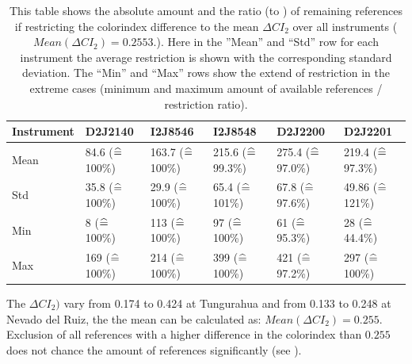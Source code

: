 \begin{table}[h]
	\centering
	\begin{tabular}{|p{1.8cm}|p{2.15cm}|p{2.15cm}|p{2.15cm}|p{2.15cm}|p{2.15cm}|}
		Instrument	&D2J2140&I2J8546& I2J8548&D2J2200&D2J2201\\
		\toprule
		Mean&
		84.6 ($\mathrel{\widehat{=}}\,$100\%) &	163.7 ($\mathrel{\widehat{=}}\,$100\%)&	215.6 ($\mathrel{\widehat{=}}\,$99.3\%)&
		275.4 ($\mathrel{\widehat{=}}\,$97.0\%) &219.4 ($\mathrel{\widehat{=}}\,$97.3\%) \\
		\midrule
		Std&
		35.8 ($\mathrel{\widehat{=}}\,$100\%) &	29.9 ($\mathrel{\widehat{=}}\,$100\%) &
		65.4 ($\mathrel{\widehat{=}}\,$101\%)&
		67.8 ($\mathrel{\widehat{=}}\,$97.6\%) &
		49.86 ($\mathrel{\widehat{=}}\,$121\%) \\
		\midrule
		Min&
		8 ($\mathrel{\widehat{=}}\,$100\%) &
		113 ($\mathrel{\widehat{=}}\,$100\%) 
		&97 ($\mathrel{\widehat{=}}\,$100\%) 
		&61 ($\mathrel{\widehat{=}}\,$95.3\%) 
		&28	 ($\mathrel{\widehat{=}}\,$44.4\%) \\
		\midrule
		Max
		&169 ($\mathrel{\widehat{=}}\,$100\%) 
		&214 ($\mathrel{\widehat{=}}\,$100\%) 
		&399 ($\mathrel{\widehat{=}}\,$100\%) 
		&421 ($\mathrel{\widehat{=}}\,$97.2\%) 
		&297 ($\mathrel{\widehat{=}}\,$100\%)  \\
		\bottomrule
	\end{tabular}
	\caption{This table shows the absolute amount and the ratio  (to ) of remaining references if restricting the colorindex difference to the mean $\Delta CI_{2}$ over all instruments ($Mean(\Delta CI_{2}) = 0.2553.$). Here in the ”Mean” and “Std” row for each  instrument the average restriction is shown with the corresponding standard deviation. The “Min” and “Max” rows show the extend of restriction in the extreme cases (minimum and maximum amount of available references / restriction ratio).}
	\label{tab:colidxres}
\end{table}	
The $\Delta CI_{2})$ vary from 0.174 to 0.424 at Tungurahua and from 0.133 to 0.248 at Nevado del Ruiz, the
the mean can be calculated as: $Mean(\Delta CI_{2}) = 0.255$. Exclusion of all references with a higher difference in the colorindex than $ 0.255$ does not chance the amount of references significantly (see ).\\


